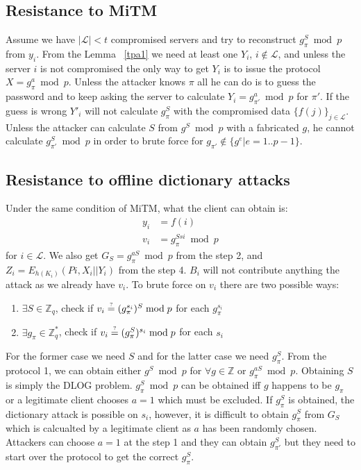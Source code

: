\subsection{Resistance to MiTM}
Assume we have $|\mathcal{L}| < t$ compromised servers and try to
reconstruct $g_{\pi}^S \bmod p$ from ${y_i}$. From the Lemma
~\ref{tpa1} we need at least one $Y_i$, $i \notin \mathcal{L}$, and
unless the server $i$ is not compromised the only way to get $Y_i$ is
to issue the protocol $X = g_{\pi}^a \bmod p$. Unless the attacker
knows $\pi$ all he can do is to guess the password and to keep asking
the server to calculate $Y_i = g_{\pi'}^a \bmod p$ for $\pi'$. If the
guess is wrong $Y'_i$ will not calculate $g_{\pi}^S$ with the
compromised data $\{f(j)\}_{j \in \mathcal{L}}$.
Unless the attacker can calculate $S$ from $g^S \bmod p$ with a
fabricated $g$, he cannot calculate $g_{\pi'}^S \bmod p$ in
order to brute force for $g_{\pi'} \notin \{g^e | e = 1..p-1\}$.

\subsection{Resistance to offline dictionary attacks}
Under the same condition of MiTM, what the client can obtain is:
\begin{align*}
  y_i &= f(i) \\
  v_i &= g_{\pi}^{Ssi} \bmod p
\end{align*}
for $i \in \mathcal{L}$. We also get $G_S = g_{\pi}^{aS} \bmod p$ from
the step 2, and $Z_i = E_{h(K_i)}(Pi, X_i||Y_i)$ from the step
4. $B_i$ will not contribute anything the attack as we already have
$v_i$.
To brute force on $v_i$ there are two possible ways:
\begin{enumerate}
\item $\exists S \in \mathbb{Z}_q$, check if
  $v_i \stackrel{\text{\tiny ?}}{=} (g_{\pi}^{s_i})^S \bmod p$
  for each $g_{\pi}^{s_i}$ \\
\item $\exists g_{\pi} \in \mathbb{Z}^*_q$, check if
  $v_i \stackrel{\text{\tiny ?}}{=} (g_{\pi}^S)^{s_i} \bmod p$
  for each $s_i$
\end{enumerate}
For the former case we need $S$ and for the latter case we need
$g_{\pi}^S$. From the protocol 1, we can obtain either $g^S \bmod p$
for $\forall g \in \mathbb{Z}$ or $g_{\pi}^{aS} \bmod p$. Obtaining
$S$ is simply the {\sf DLOG} problem. $g_{\pi}^S \bmod p$ can be
obtained iff $g$ happens to be $g_{\pi}$ or a legitimate client
chooses $a = 1$ which must be excluded.
If $g_{\pi}^S$ is obtained, the dictionary attack is possible on
$s_i$, however, it is difficult to obtain $g_{\pi}^S$ from $G_S$ which
is calcualted by a legitimate client as $a$ has been randomly
chosen. Attackers can choose $a = 1$ at the step 1 and they can obtain
$g_{\pi'}^S$ but they need to start over the protocol to get the
correct $g_{\pi}^S$.
